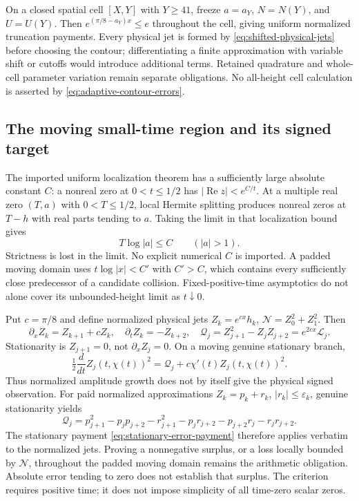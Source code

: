 \documentclass[11pt]{article}
\numberwithin{equation}{section}
\theoremstyle{definition}
\theoremstyle{remark}
\newcommand{\Lag}{\mathscr L}
\begin{document}
On a closed spatial cell \([X,Y]\) with \(Y\ge41\), freeze \(a=a_Y\), \(N=N(Y)\),
and \(U=U(Y)\). Then \(e^{(\pi/8-a_Y)x}\le e\) throughout the
cell, giving uniform normalized truncation payments. Every physical jet
is formed by \eqref{eq:shifted-physical-jets} before choosing the contour;
differentiating a finite approximation with variable shift or cutoffs
would introduce additional terms. Retained quadrature and whole-cell
parameter variation remain separate obligations. No all-height cell
calculation is asserted by \eqref{eq:adaptive-contour-errors}.

\subsection{The moving small-time region and its signed target}

The imported uniform localization theorem \cite[Theorem 1.5(i)]{polymath}
has a sufficiently large absolute constant \(C\): a nonreal zero at
\(0<t\le1/2\) has \(|\operatorname{Re}z|<e^{C/t}\).
At a multiple real zero \((T,a)\) with \(0<T\le1/2\), local Hermite splitting produces
nonreal zeros at \(T-h\) with real parts tending to \(a\).
Taking the limit in that localization bound gives
\begin{equation}
 T\log|a|\le C\qquad(|a|>1).
 \label{eq:collision-cusp-bound}
\end{equation}
Strictness is lost in the limit. No explicit numerical \(C\) is
imported. A padded moving domain uses \(t\log|x|<C'\) with \(C'>C\),
which contains every sufficiently close predecessor of a candidate
collision. Fixed-positive-time asymptotics do not alone cover its
unbounded-height limit as \(t\downarrow0\).

Put \(c=\pi/8\) and define normalized physical jets
\(Z_k=e^{cx}h_k\), \(\mathcal N=Z_0^2+Z_1^2\). Then
\[
 \partial_xZ_k=Z_{k+1}+cZ_k,\quad \partial_tZ_k=-Z_{k+2},\quad
 \mathcal Q_j=Z_{j+1}^2-Z_jZ_{j+2}=e^{2cx}\Lag_j.
\]
Stationarity is \(Z_{j+1}=0\), not \(\partial_xZ_j=0\).
On a moving genuine stationary branch,
\[
 \tfrac12\frac d{dt}Z_j(t,\chi(t))^2
 =\mathcal Q_j+c\chi'(t)Z_j(t,\chi(t))^2.
\]
Thus normalized amplitude growth does not by itself give the physical
signed observation. For paid normalized approximations
\(Z_k=p_k+r_k\), \(|r_k|\le\varepsilon_k\), genuine stationarity yields
\[
 \mathcal Q_j=p_{j+1}^2-p_jp_{j+2}-r_{j+1}^2
 -p_jr_{j+2}-p_{j+2}r_j-r_jr_{j+2}.
\]
The stationary payment \eqref{eq:stationary-error-payment} therefore
applies verbatim to the normalized jets. Proving a nonnegative surplus,
or a loss locally bounded by \(\mathcal N\), throughout the padded
moving domain remains the arithmetic obligation. Absolute error tending
to zero does not establish that surplus. The criterion requires positive
time; it does not impose simplicity of all time-zero scalar zeros.
\end{document}
